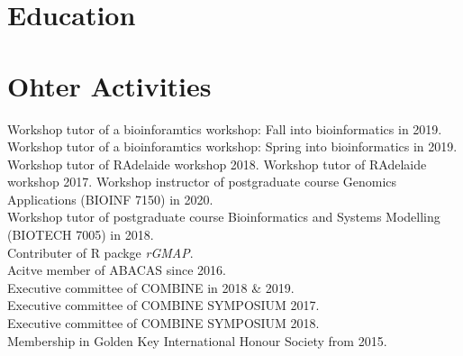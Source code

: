 \documentclass[]{deedy-resume-openfont}
\begin{document}
\section{Education}
\sectionsep

\sectionsep

\sectionsep

\section{Ohter Activities}
Workshop tutor of a bioinforamtics workshop: Fall into bioinformatics in 2019.
Workshop tutor of a bioinforamtics workshop: Spring into bioinformatics in 2019.
Workshop tutor of RAdelaide workshop 2018.
Workshop tutor of RAdelaide workshop 2017.
Workshop instructor of postgraduate course Genomics Applications (BIOINF 7150) in 2020.\\
Workshop tutor of postgraduate course Bioinformatics and Systems Modelling (BIOTECH 7005) in 2018.\\
Contributer of R packge \textit{rGMAP}.\\
Acitve member of ABACAS since 2016.\\
Executive committee of COMBINE in 2018 \& 2019.\\
Executive committee of COMBINE SYMPOSIUM 2017.\\
Executive committee of COMBINE SYMPOSIUM 2018.\\
Membership in Golden Key International Honour Society from 2015.\\
\end{document}
